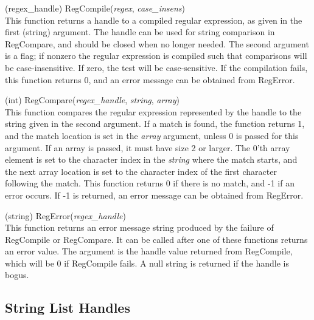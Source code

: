 \begin{description}
\item{(regex\_handle) \vt RegCompile({\it regex}, {\it case\_insens\/})}\\
This function returns a handle to a compiled regular expression, as
given in the first (string) argument.  The handle can be used for
string comparison in {\vt RegCompare}, and should be closed when no
longer needed.  The second argument is a flag; if nonzero the regular
expression is compiled such that comparisons will be case-insensitive. 
If zero, the test will be case-sensitive.  If the compilation fails,
this function returns 0, and an error message can be obtained from
{\vt RegError}.

\item{(int) \vt RegCompare({\it regex\_handle}, {\it string},
  {\it array\/})}\\
This function compares the regular expression represented by the
handle to the string given in the second argument.  If a match is
found, the function returns 1, and the match location is set in the
{\it array} argument, unless 0 is passed for this argument.  If an
array is passed, it must have size 2 or larger.  The 0'th array
element is set to the character index in the {\it string} where the
match starts, and the next array location is set to the character
index of the first character following the match.  This function
returns 0 if there is no match, and -1 if an error occurs.  If -1 is
returned, an error message can be obtained from {\vt RegError}.

\item{(string) \vt RegError({\it regex\_handle})}\\
This function returns an error message string produced by the failure
of {\vt RegCompile} or {\vt RegCompare}.  It can be called after one
of these functions returns an error value.  The argument is the handle
value returned from {\vt RegCompile}, which will be 0 if {\vt
RegCompile} fails.  A null string is returned if the handle is bogus.

\end{description}


\subsection{String List Handles}

